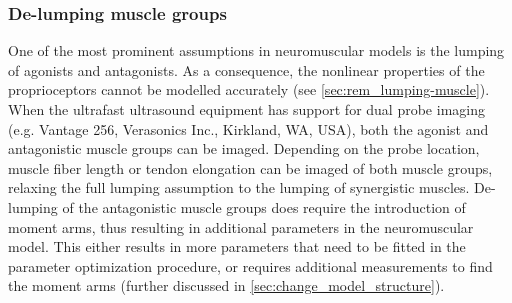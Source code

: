 


\subsubsection{De-lumping muscle groups}
One of the most prominent assumptions in neuromuscular models is the lumping of agonists and antagonists. As a consequence, the nonlinear properties of the proprioceptors cannot be modelled accurately (see \autoref{sec:rem_lumping-muscle}). When the ultrafast ultrasound equipment has support for dual probe imaging (e.g. Vantage 256, Verasonics Inc., Kirkland, WA, USA), both the agonist and antagonistic muscle groups can be imaged. Depending on the probe location, muscle fiber length or tendon elongation can be imaged of both muscle groups, relaxing the full lumping assumption to the lumping of synergistic muscles. De-lumping of the antagonistic muscle groups does require the introduction of moment arms, thus resulting in additional parameters in the neuromuscular model. This either results in more parameters that need to be fitted in the parameter optimization procedure, or requires additional measurements to find the moment arms (further discussed in \autoref{sec:change_model_structure}). 







